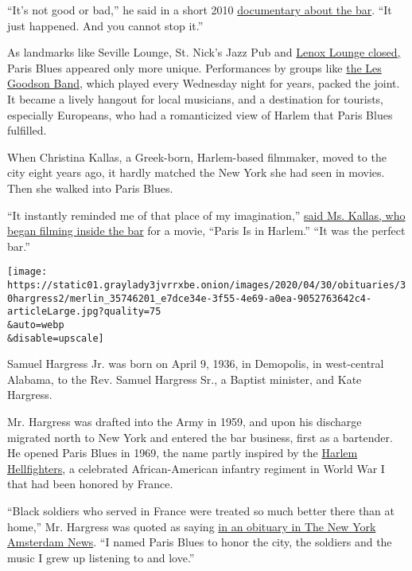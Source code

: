 ``It's not good or bad,'' he said in a short 2010
\href{https://viewing.nyc/mr-blues-a-profile-of-harlems-paris-blues-bar-and-owner-samuel-hargress-jr/}{documentary
about the bar}. ``It just happened. And you cannot stop it.''

As landmarks like Seville Lounge, St. Nick's Jazz Pub and
\href{https://www.nytimes3xbfgragh.onion/2012/12/08/nyregion/harlem-to-say-goodbye-to-the-lenox-lounge.html}{Lenox
Lounge closed,} Paris Blues appeared only more unique. Performances by
groups like \href{https://www.youtube.com/watch?v=oqxQsgDyj1g}{the Les
Goodson Band}, which played every Wednesday night for years, packed the
joint. It became a lively hangout for local musicians, and a destination
for tourists, especially Europeans, who had a romanticized view of
Harlem that Paris Blues fulfilled.

When Christina Kallas, a Greek-born, Harlem-based filmmaker, moved to
the city eight years ago, it hardly matched the New York she had seen in
movies. Then she walked into Paris Blues.

``It instantly reminded me of that place of my imagination,''
\href{http://www.talkhouse.com/harlem-blues-remembering-sam-hargress-jr/}{said
Ms. Kallas, who began filming inside the bar} for a movie, ``Paris Is in
Harlem.'' ``It was the perfect bar.''

\texttt{[image: https://static01.graylady3jvrrxbe.onion/images/2020/04/30/obituaries/30hargress2/merlin\_35746201\_e7dce34e-3f55-4e69-a0ea-9052763642c4-articleLarge.jpg?quality=75\\\&auto=webp\\\&disable=upscale]}

Samuel Hargress Jr. was born on April 9, 1936, in Demopolis, in
west-central Alabama, to the Rev. Samuel Hargress Sr., a Baptist
minister, and Kate Hargress.

Mr. Hargress was drafted into the Army in 1959, and upon his discharge
migrated north to New York and entered the bar business, first as a
bartender. He opened Paris Blues in 1969, the name partly inspired by
the
\href{https://www.smithsonianmag.com/history/one-hundred-years-ago-harlem-hellfighters-bravely-led-us-wwi-180968977/}{Harlem
Hellfighters}, a celebrated African-American infantry regiment in World
War I that had been honored by France.

``Black soldiers who served in France were treated so much better there
than at home,'' Mr. Hargress was quoted as saying
\href{http://amsterdamnews.com/news/2020/apr/23/paris-blues-owner-dies/}{in
an obituary in The New York Amsterdam News}. ``I named Paris Blues to
honor the city, the soldiers and the music I grew up listening to and
love.''

